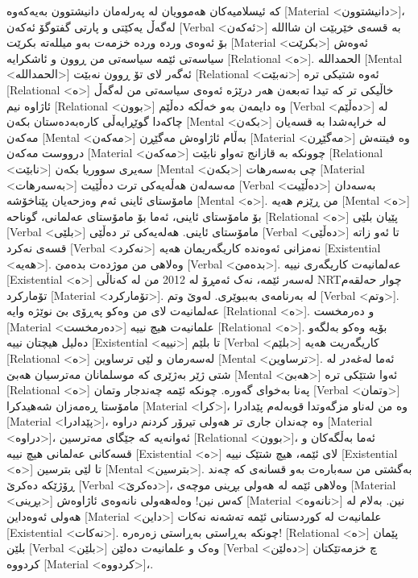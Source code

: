 کە ئیسلامیەکان هەموویان لە پەرلەمان دانیشتوون بەیەکەوە [Material <دانیشتوون>]، لەگەڵ یەکێتی و پارتی گفتوگۆ ئەکەن [Verbal <ئەکەن>] بە قسەی خێربێت ان شااللە بۆ ئەوەی وردە وردە خزمەت بەو میللەتە بکرێت [Material <بکرێت>] ئەوەش سیاسەتی ئێمە سیاسەتی من ڕوون و ئاشکرایە [Relational <ە>]. الحمداللە [Mental <الحمداللە>] ئەگەر لای تۆ ڕوون نەبێت [Relational <نەبێت>] ئەوە شتیکی ترە [Relational <ە>] خاڵیکی تر کە تیدا تەبعەن هەر درێژە ئەوەی سیاسەتی من لەگەڵ ئاژاوە نیم [Relational <بوون>] وە دایمەن بەو خەڵکە دەڵێم [Verbal <دەڵێم>] لە چاکەدا گوێڕایەڵی کارەبەدەستان بکەن [Mental <بکەن>] لە خراپەشدا بە قسەیان مەکەن [Mental <مەکەن>] بەڵام ئاژاوەش مەگێڕن [Material <مەگێڕن>] وە فیتنەش درووست مەکەن [Material <مەکەن>] چوونکە بە قازانج تەواو نابێت [Relational <نابێت>] سەیری سووریا بکەن [Mental <بکەن>] چی بەسەرهات [Material <بەسەرهات>] مەسەلەن هەڵەیەکی ترت دەڵێیت [Verbal <دەڵێیت>] بەسەدان مامۆستای ئاینی ئەم وەزحەیان پێناخۆشە [Mental <ە>]. من ڕێزم هەیە [Mental <ە>] بۆ مامۆستای ئاینی، ئەما بۆ مامۆستای عەلمانی، گوناحە [Relational <ە>] پێیان بلێی [Verbal <بلێی>] مامۆستای ئاینی. هەلەیەکی تر دەڵێی [Verbal <دەڵێی>] تا ئەو زاتە قسەی نەکرد [Verbal <نەکرد>] نەمزانی ئەوەندە کاریگەریمان هەیە [Existential <هەیە>]. وەلاهی من موژدەت بدەمێ [Verbal <بدەمێ>].
عەلمانیەت کاریگەری نییە [Existential <ە>] لەسەر ئێمە، نەک ئەمڕۆ لە 2012 من لە کەناڵی NRTچوار حەلقەم تۆمارکرد [Material <تۆمارکرد>]. لە بەرنامەی بەببوێری. لەوێ وتم [Verbal <وتم>].
عەلمانیەت لای من وەکو پەڕۆی بێ نوێژە وایە [Relational <ە>]. و دەرمخست [Material <دەرمخست>] علمانیەت هیچ نییە [Relational <ە>]. بۆیە وەکو بەلگەو دەلیل هیچتان نییە [Existential <نییە>] تا بلێم [Verbal <بلێم>] کاریگەریت هەیە [Relational <ە>] لەسەرمان و لێی ترساوین [Mental <ترساوین>]. ئەما لەغەدر لە شتی ژێر بەژێری کە موسلمانان مەترسیان هەبێ [Mental <هەبێ>] ئەوا شتێکی ترە [Relational <ە>] پەنا بەخوای گەورە. چونکە ئێمە چەندجار وتمان [Verbal <وتمان>] مامۆستا ڕەمەزان شەهیدکرا [Material <کرا>]، وە من لەناو مزگەوتدا قوبەلەم پێدادرا [Material <پێدادرا>]، وە چەندان جاری تر هەولی تیرۆر کردنم دراوە [Material <دراوە>]، ئەوانەیە کە جێگای مەترسین [Relational <بوون>]، ئەما بەڵگەکان و قسەکانی عەلمانی هیچ نییە [Existential <ە>] لای ئێمە، هیچ شتێک نییە [Existential <ە>] تا لێی بترسین [Mental <بترسین>]. بەگشتی من سەبارەت بەو قسانەی کە چەند ڕۆژێکە دەکرێ [Verbal <دەکرێ>]، وەلاهی ئێمە لە هەولی بڕینی موچەی [Material <بڕینی>] کەس نین! وەلەهەولی نانەوەی ئاژاوەش [Material <نانەوە>] نین. بەلام لە هەولی ئەوەداین [Material <داین>] علمانیەت لە کوردستانی ئێمە تەشەنە نەکات [Existential <نەکات>]. چونکە بەڕاستی بەڕاستی زەرەرە! [Relational <ە>] پێمان بلێن [Verbal <بلێن>] وەک و علمانیەت دەلێن [Verbal <دەلێن>] چ خزمەتێکتان کردووە [Material <کردووە>]،.

